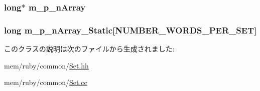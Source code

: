 \label{classSet_a596ca3ad7845fc90a3bc5b0b39f8a439}
\hypertarget{classSet_a92c58ed80e0e7dade7838d3d300cc4cf}{
\subsubsection[{m\_\-p\_\-nArray}]{\setlength{\rightskip}{0pt plus 5cm}long$\ast$ {\bf m\_\-p\_\-nArray}}}
\label{classSet_a92c58ed80e0e7dade7838d3d300cc4cf}
\hypertarget{classSet_a3fef4acb279bdd97b96c6da7b042cc1e}{
\subsubsection[{m\_\-p\_\-nArray\_\-Static}]{\setlength{\rightskip}{0pt plus 5cm}long {\bf m\_\-p\_\-nArray\_\-Static}\mbox{[}{\bf NUMBER\_\-WORDS\_\-PER\_\-SET}\mbox{]}}}
\label{classSet_a3fef4acb279bdd97b96c6da7b042cc1e}


このクラスの説明は次のファイルから生成されました:\begin{DoxyCompactItemize}
\item 
mem/ruby/common/\hyperlink{Set_8hh}{Set.hh}\item 
mem/ruby/common/\hyperlink{Set_8cc}{Set.cc}\end{DoxyCompactItemize}
